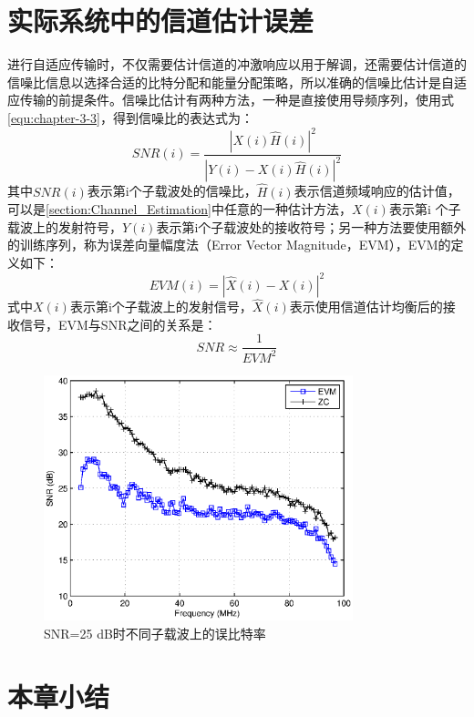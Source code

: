 \section{实际系统中的信道估计误差}
进行自适应传输时，不仅需要估计信道的冲激响应以用于解调，还需要估计信道的信噪比信息以选择合适的比特分配和能量分配策略，所以准确的信噪比估计是自适应传输的前提条件。信噪比估计有两种方法，一种是直接使用导频序列，使用式\ref{equ:chapter-3-3}，得到信噪比的表达式为：
\begin{equation}
SNR(i) = \frac{|X(i) \hat{H}(i)|^2}{|Y(i)-X(i) \hat{H}(i)|^2}
\end{equation}
其中$SNR(i)$表示第i个子载波处的信噪比，$\hat{H}(i)$表示信道频域响应的估计值，可以是\ref{section:Channel_Estimation}中任意的一种估计方法，$X(i)$表示第i 个子载波上的发射符号，$Y(i)$表示第i个子载波处的接收符号；另一种方法要使用额外的训练序列，称为误差向量幅度法（Error Vector Magnitude，EVM），EVM的定义如下：
\begin{equation}
EVM(i) = |\hat{X}(i)-X(i)|^2
\end{equation}
式中$X(i)$表示第i个子载波上的发射信号，$\hat{X}(i)$表示使用信道估计均衡后的接收信号，EVM与SNR之间的关系是\cite{shafik2006extended}：
\begin{equation}
SNR \approx \frac{1}{EVM^2}
\end{equation}

\begin{figure}[htbp]
\centering
\includegraphics[width=0.8\textwidth]{figures/chapter-3/SNR_ZC_EVM.eps}
\caption{SNR=25 dB时不同子载波上的误比特率}
\label{fig:BER_sc}
\end{figure}
\section{本章小结}
